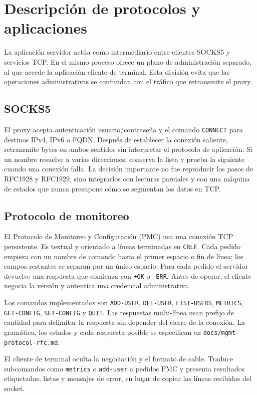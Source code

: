 \section{Descripción de protocolos y aplicaciones}

La aplicación servidor actúa como intermediario entre clientes SOCKS5 y
servicios TCP. En el mismo proceso ofrece un plano de administración separado,
al que accede la aplicación cliente de terminal. Esta división evita que las
operaciones administrativas se confundan con el tráfico que retransmite el
proxy.

\subsection{SOCKS5}

El proxy acepta autenticación usuario/contraseña y el comando \texttt{CONNECT}
para destinos IPv4, IPv6 o FQDN. Después de establecer la conexión saliente,
retransmite bytes en ambos sentidos sin interpretar el protocolo de aplicación.
Si un nombre resuelve a varias direcciones, conserva la lista y prueba la
siguiente cuando una conexión falla. La decisión importante no fue reproducir
los pasos de RFC1928 y RFC1929, sino integrarlos con lecturas parciales y con una
máquina de estados que nunca presupone cómo se segmentan los datos en TCP.

\subsection{Protocolo de monitoreo}

El Protocolo de Monitoreo y Configuración (PMC) usa una conexión TCP persistente.
Es textual y orientado a líneas terminadas en \texttt{CRLF}. Cada pedido empieza
con un nombre de comando hasta el primer espacio o fin de línea; los campos
restantes se separan por un único espacio. Para cada pedido el servidor devuelve
una respuesta que comienza con \texttt{+OK} o \texttt{-ERR}. Antes de operar, el
cliente negocia la versión y autentica una credencial administrativa.

Los comandos implementados son \texttt{ADD-USER}, \texttt{DEL-USER},
\texttt{LIST-USERS}, \texttt{METRICS}, \texttt{GET-CONFIG},
\texttt{SET-CONFIG} y \texttt{QUIT}. Las respuestas multi-línea usan prefijo de
cantidad para delimitar la respuesta sin depender del cierre de la conexión. La
gramática, los estados y cada respuesta posible se especifican en
\texttt{docs/mgmt-protocol-rfc.md}.

El cliente de terminal oculta la negociación y el formato de cable. Traduce
subcomandos como \texttt{metrics} o \texttt{add-user} a pedidos PMC y presenta
resultados etiquetados, listas y mensajes de error, en lugar de copiar las líneas
recibidas del socket.
